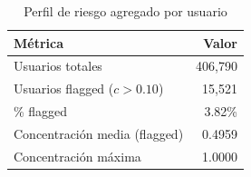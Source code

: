\begin{table}[htbp]
\centering
\small
\caption{Perfil de riesgo agregado por usuario}
\label{tab:user-risk-profile}
\begin{tabular}{lr}
\toprule
Métrica & Valor \\
\midrule
  Usuarios totales & 406,790 \\
  Usuarios flagged ($c > 0.10$) & 15,521 \\
  \% flagged & 3.82\% \\
  Concentración media (flagged) & 0.4959 \\
  Concentración máxima & 1.0000 \\
\bottomrule
\end{tabular}
\end{table}
